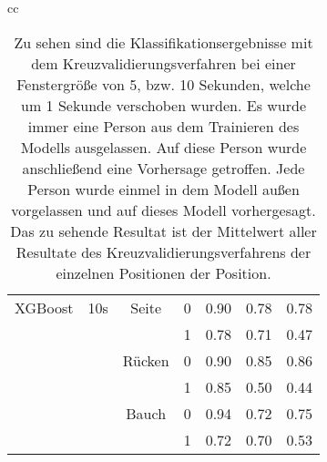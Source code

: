 \begin{table}
\begin{tabular} {cc}
\begin{minipage}{1\linewidth}
\begin{center}
\begin{tabular}{ | l | c | c | c | c | c | r | }
            \hline
            XGBoost & 10s & Seite & 0 & 0.90 & 0.78 & 0.78 \\
                    &     &       & 1 & 0.78 & 0.71 & 0.47 \\ \hline
                    &     & Rücken& 0 & 0.90 & 0.85 & 0.86 \\
                    &     &       & 1 & 0.85 & 0.50 & 0.44 \\ \hline
                    &     & Bauch & 0 & 0.94 & 0.72 & 0.75 \\
                    &     &       & 1 & 0.72 & 0.70 & 0.53 \\ \hline
          \end{tabular}
          \smallskip
      \end{center}
  \end{minipage} 
    
  \end{tabular}
  \caption{Zu sehen sind die Klassifikationsergebnisse mit dem Kreuzvalidierungsverfahren bei einer Fenstergröße von 5, bzw. 10 Sekunden, welche um 1 Sekunde verschoben wurden. Es wurde immer eine Person aus dem Trainieren des Modells ausgelassen. Auf diese Person wurde anschließend eine Vorhersage getroffen. Jede Person wurde einmel in dem Modell außen vorgelassen und auf dieses Modell vorhergesagt. Das zu sehende Resultat ist der Mittelwert aller Resultate des Kreuzvalidierungsverfahrens der einzelnen Positionen der Position.}
  \label{evaluation:loso_classification_results}  
\end{table}


